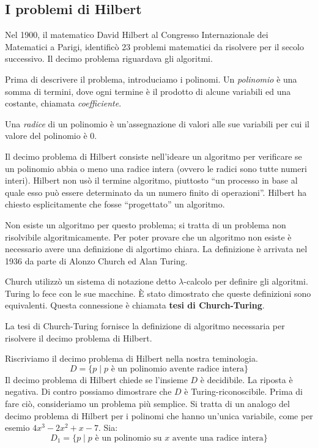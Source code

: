 \documentclass[12pt]{report}
\begin{document}
\subsection{I problemi di Hilbert}
Nel 1900, il matematico David Hilbert al Congresso Internazionale dei Matematici a Parigi, identificò 23 problemi matematici da risolvere per il secolo successivo. Il decimo problema riguardava gli algoritmi.

Prima di descrivere il problema, introduciamo i polinomi. Un \textit{polinomio} è una somma di termini, dove ogni termine è il prodotto di alcune variabili ed una costante, chiamata \textit{coefficiente}.

Una \textit{radice} di un polinomio è un'assegnazione di valori alle sue variabili per cui il valore del polinomio è 0.

Il decimo problema di Hilbert consiste nell'ideare un algoritmo per verificare se un polinomio abbia o meno una radice intera (ovvero le radici sono tutte numeri interi). Hilbert non usò il termine algoritmo, piuttosto ``un processo in base al quale esso può essere determinato da un numero finito di operazioni''. Hilbert ha chiesto esplicitamente che fosse ``progettato'' un algoritmo.

Non esiste un algoritmo per questo problema; si tratta di un problema non risolvibile algoritmicamente. Per poter provare che un algoritmo non esiste è necessario avere una definizione di algortimo chiara. La definizione è arrivata nel 1936 da parte di Alonzo Church ed Alan Turing.

Church utilizzò un sistema di notazione detto $\lambda$-calcolo per definire gli algoritmi. Turing lo fece con le sue macchine. È stato dimostrato che queste definizioni sono equivalenti. Questa connessione è chiamata \textbf{tesi di Church-Turing}.

La tesi di Church-Turing fornisce la definizione di algoritmo necessaria per risolvere il decimo problema di Hilbert.

Riscriviamo il decimo problema di Hilbert nella nostra teminologia.
\[
D = \{p \mid p \text{ è un polinomio avente radice intera}\}
\]
Il decimo problema di Hilbert chiede se l'insieme $D$ è decidibile. La riposta è negativa. Di contro possiamo dimostrare che $D$ è Turing-riconoscibile. Prima di fare ciò, consideriamo un problema più semplice. Si tratta di un analogo del decimo problema di Hilbert per i polinomi che hanno un'unica variabile, come per esemio $4x^3 - 2x^2 + x - 7$. Sia:
\[
D_1 = \{p \mid p \text{ è un polinomio su $x$ avente una radice intera}\}
\]
\end{document}
